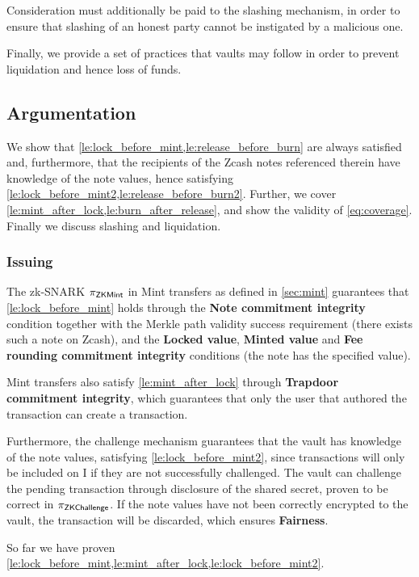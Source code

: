 \begin{itemize}
    Consideration must additionally be paid to the slashing mechanism, in order to ensure that slashing of an honest party cannot be instigated by a malicious one.

    Finally, we provide a set of practices that vaults may follow in order to prevent liquidation and hence loss of funds.
\end{itemize}

\subsection{Argumentation}

We show that \cref{le:lock_before_mint,le:release_before_burn} are always satisfied and, furthermore, that the recipients of the Zcash notes referenced therein have knowledge of the note values, hence satisfying \cref{le:lock_before_mint2,le:release_before_burn2}.
Further, we cover \cref{le:mint_after_lock,le:burn_after_release}, and show the validity of \cref{eq:coverage}.
Finally we discuss slashing and liquidation.

\subsubsection{Issuing}

The zk-SNARK $\pi_{\mathsf{ZKMint}}$ in Mint transfers as defined in \cref{sec:mint} guarantees that \cref{le:lock_before_mint} holds through the \textbf{Note commitment integrity} condition together with the Merkle path validity success requirement (there exists such a note on Zcash), and the \textbf{Locked value}, \textbf{Minted value} and \textbf{Fee rounding commitment integrity} conditions (the note has the specified value).

Mint transfers also satisfy \cref{le:mint_after_lock} through \textbf{Trapdoor commitment integrity}, which guarantees that only the user that authored the \lock transaction can create a \mint transaction.

Furthermore, the challenge mechanism guarantees that the vault has knowledge of the note values, satisfying \cref{le:lock_before_mint2}, since \mint transactions will only be included on I if they are not successfully challenged.
The vault can challenge the pending transaction through disclosure of the shared secret, proven to be correct in $\pi_{\mathsf{ZKChallenge}}$.
If the note values have not been correctly encrypted to the vault, the transaction will be discarded, which ensures \textbf{Fairness}.

So far we have proven \cref{le:lock_before_mint,le:mint_after_lock,le:lock_before_mint2}.

